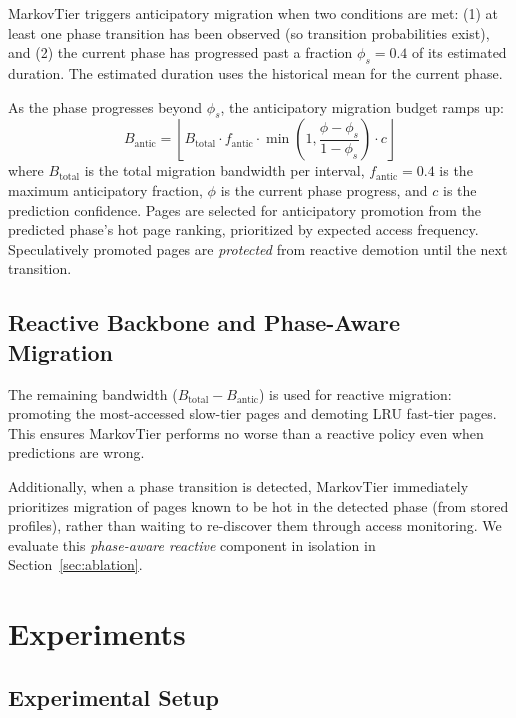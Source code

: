 \documentclass[preprint]{article}
\begin{document}
MarkovTier triggers anticipatory migration when two conditions are met: (1) at least one phase transition has been observed (so transition probabilities exist), and (2) the current phase has progressed past a fraction $\phi_s = 0.4$ of its estimated duration. The estimated duration uses the historical mean for the current phase.

As the phase progresses beyond $\phi_s$, the anticipatory migration budget ramps up:
\begin{equation}
    B_\text{antic} = \left\lfloor B_\text{total} \cdot f_\text{antic} \cdot \min\!\left(1, \frac{\phi - \phi_s}{1 - \phi_s}\right) \cdot c \right\rfloor
\end{equation}
where $B_\text{total}$ is the total migration bandwidth per interval, $f_\text{antic} = 0.4$ is the maximum anticipatory fraction, $\phi$ is the current phase progress, and $c$ is the prediction confidence. Pages are selected for anticipatory promotion from the predicted phase's hot page ranking, prioritized by expected access frequency. Speculatively promoted pages are \emph{protected} from reactive demotion until the next transition.

\subsection{Reactive Backbone and Phase-Aware Migration}

The remaining bandwidth ($B_\text{total} - B_\text{antic}$) is used for reactive migration: promoting the most-accessed slow-tier pages and demoting LRU fast-tier pages. This ensures MarkovTier performs no worse than a reactive policy even when predictions are wrong.

Additionally, when a phase transition is detected, MarkovTier immediately prioritizes migration of pages known to be hot in the detected phase (from stored profiles), rather than waiting to re-discover them through access monitoring. We evaluate this \emph{phase-aware reactive} component in isolation in Section~\ref{sec:ablation}.

\section{Experiments}
\label{sec:experiments}

\subsection{Experimental Setup}
\end{document}
